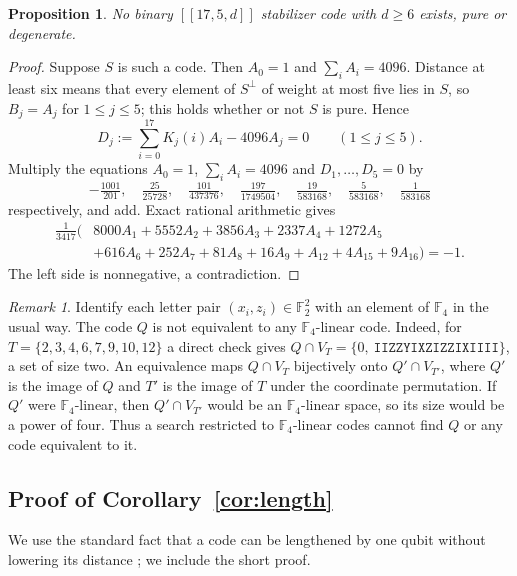 \documentclass[11pt]{article}
\newtheorem{proposition}[theorem]{Proposition}
\theoremstyle{definition}
\theoremstyle{remark}
\newtheorem{remark}[theorem]{Remark}
\newcommand{\F}{\mathbb F_2}
\newcommand{\qc}[1]{[\![#1]\!]}
\begin{document}
\begin{proposition}\label{prop:ub17}
No binary \(\qc{17,5,d}\) stabilizer code with \(d\geq6\) exists, pure
or degenerate.
\end{proposition}
\begin{proof}
Suppose \(S\) is such a code. Then \(A_0=1\) and \(\sum_iA_i=4096\).
Distance at least six means that every element of \(S^\perp\) of weight
at most five lies in \(S\), so \(B_j=A_j\) for \(1\leq j\leq5\); this
holds whether or not \(S\) is pure. Hence
\[
 D_j:=\sum_{i=0}^{17}K_j(i)A_i-4096A_j=0\qquad(1\leq j\leq5).
\]
Multiply the equations \(A_0=1\), \(\sum_iA_i=4096\) and
\(D_1,\ldots,D_5=0\) by
\[
 -\tfrac{1001}{201},\quad \tfrac{25}{25728},\quad
 \tfrac{101}{437376},\quad \tfrac{197}{1749504},\quad
 \tfrac{19}{583168},\quad \tfrac{5}{583168},\quad \tfrac{1}{583168}
\]
respectively, and add. Exact rational arithmetic gives
\[
 \begin{aligned}
 \tfrac{1}{3417}\bigl(&8000A_1+5552A_2+3856A_3+2337A_4+1272A_5\\
 &+616A_6+252A_7+81A_8+16A_9+A_{12}+4A_{15}+9A_{16}\bigr)=-1.
 \end{aligned}
\]
The left side is nonnegative, a contradiction.
\end{proof}

\begin{remark}\label{rem:additive}
Identify each letter pair \((x_i,z_i)\in\F^2\) with an element of
\(\mathbb F_4\) in the usual way. The code \(Q\) is not equivalent to
any \(\mathbb F_4\)-linear code. Indeed, for
\(T=\{2,3,4,6,7,9,10,12\}\) a direct check gives
\(Q\cap V_T=\{0,\ \texttt{IIZZYIXZIZZIXIIII}\}\), a set of size two. An
equivalence maps \(Q\cap V_T\) bijectively onto \(Q'\cap V_{T'}\), where
\(Q'\) is the image of \(Q\) and \(T'\) is the image of \(T\) under the
coordinate permutation. If \(Q'\) were \(\mathbb F_4\)-linear, then
\(Q'\cap V_{T'}\) would be an \(\mathbb F_4\)-linear space, so its size
would be a power of four. Thus a search restricted to
\(\mathbb F_4\)-linear codes cannot find \(Q\) or any code equivalent to
it.
\end{remark}

\subsection{Proof of Corollary~\ref{cor:length}}

We use the standard fact that a code can be lengthened by one qubit
without lowering its distance \cite{crss}; we include the short proof.
\end{document}

